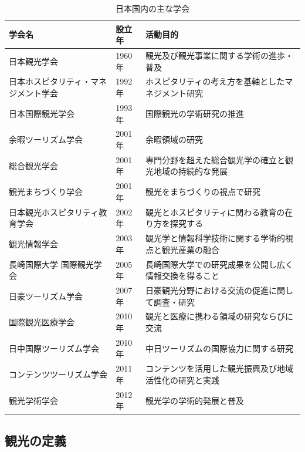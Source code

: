 \documentclass{jsarticle}
\begin{document}
\begin{table}[!h]
\small
\caption{日本国内の主な学会\cite{japanese_society_list}}
\begin{center}
\begin{tabular}{lll}
\label{japanese_society}
学会名 & 設立年 & 活動目的 \\ \hline
日本観光学会                            & 1960年 & 観光及び観光事業に関する学術の進歩・普及 \\
日本ホスピタリティ・マネジメント学会    & 1992年 & ホスピタリティの考え方を基軸としたマネジメント研究 \\
日本国際観光学会                        & 1993年 & 国際観光の学術研究の推進 \\
余暇ツーリズム学会                      & 2001年 & 余暇領域の研究 \\
総合観光学会                            & 2001年 & 専門分野を超えた総合観光学の確立と観光地域の持続的な発展 \\
観光まちづくり学会                      & 2001年 & 観光をまちづくりの視点で研究 \\
日本観光ホスピタリティ教育学会          & 2002年 & 観光とホスピタリティに関わる教育の在り方を探究する \\
観光情報学会                            & 2003年 & 観光学と情報科学技術に関する学術的視点と観光産業の融合 \\
長崎国際大学 国際観光学会               & 2005年 & 長崎国際大学での研究成果を公開し広く情報交換を得ること \\
日豪ツーリズム学会                      & 2007年 & 日豪観光分野における交流の促進に関して調査・研究 \\
国際観光医療学会                        & 2010年 & 観光と医療に携わる領域の研究ならびに交流 \\
日中国際ツーリズム学会                  & 2010年 & 中日ツーリズムの国際協力に関する研究 \\
コンテンツツーリズム学会                & 2011年 & コンテンツを活用した観光振興及び地域活性化の研究と実践 \\
観光学術学会                            & 2012年 & 観光学の学術的発展と普及 \\
\end{tabular}
\end{center}
\end{table}


\subsection{観光の定義}
\end{document}
